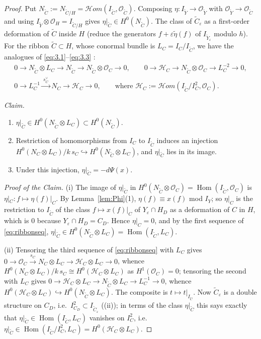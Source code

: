 \documentclass[11pt,twoside]{amsart}
\theoremstyle{plain}
\theoremstyle{definition}
\newcommand{\OO}{\mathcal{O}}
\newcommand{\sHom}{\mathcal{H}om}
\newcommand{\Hom}{\operatorname{Hom}}
\newcommand{\Yt}{\widetilde{Y}}
\newcommand{\Ct}{\widetilde{C}}
\newcommand{\Hc}{\mathcal{H}}
\newcommand{\Dd}{D}
\begin{document}
\begin{proof}
Put $N_{\Ct}:=N_{\Ct/H}=\sHom(I_{\Ct},\OO_{\Ct})$. Composing $\eta\colon I_{\Yt}\to\OO_{\Yt}$ with $\OO_{\Yt}\to\OO_{\Ct}$ and using $I_{\Yt}\otimes\OO_H=I_{\Ct/H}$ gives $\eta|_{\Ct}\in H^0(N_{\Ct})$. The class of $\Ct_\varepsilon$ as a first-order deformation of $\Ct$ inside $H$ (reduce the generators $f+\varepsilon\tilde\eta(f)$ of $I_{\Yt_\varepsilon}$ modulo $h$). For the ribbon $\Ct\subset H$, whose conormal bundle is $L_C=I_C/I_{\Ct}$, we have the analogues of \eqref{eq:3.1}--\eqref{eq:3.3} \cite[Lemma~4.1]{GGP08}:
\begin{equation}\label{eq:ribbonseq}
\begin{gathered}
0\to N_{\Ct}\otimes L_C\to N_{\Ct}\to N_{\Ct}\otimes\OO_C\to0,\qquad
0\to\Hc_C\to N_{\Ct}\otimes\OO_C\to L_C^{-2}\to0,\\
0\to L_C^{-1}\xrightarrow{\ s_C^{\vee}\ }N_C\to\Hc_C\to0,\qquad\text{where }\Hc_C:=\sHom(I_{\Ct}/I_C^2,\OO_C).
\end{gathered}
\end{equation}

\emph{Claim.}
\begin{enumerate}
\item[(i)] $\eta|_{\Ct}\in H^0(N_{\Ct}\otimes L_C)\subset H^0(N_{\Ct})$.
\item[(ii)] Restriction of homomorphisms from $I_C$ to $I_{\Ct}$ induces an injection $H^0(N_C\otimes L_C)/k\,s_C\hookrightarrow H^0(N_{\Ct}\otimes L_C)$, and $\eta|_{\Ct}$ lies in its image.
\item[(iii)] Under this injection, $\eta|_{\Ct}=-d\Psi(x)$.
\end{enumerate}

\emph{Proof of the Claim.} (i) The image of $\eta|_{\Ct}$ in $H^0(N_{\Ct}\otimes\OO_C)=\Hom(I_{\Ct},\OO_C)$ is $\eta|_C\colon f\mapsto\eta(f)|_C$. By Lemma~\ref{lem:Phi}(1), $\eta(f)\equiv x(f)$ mod $I_Y$; so $\eta|_C$ is the restriction to $I_{\Ct}$ of the class $f\mapsto x(f)|_C$ of $Y_\varepsilon\cap H_\Dd$ as a deformation of $C$ in $H$, which is $0$ because $Y_\varepsilon\cap H_\Dd=C_\Dd$. Hence $\eta|_C=0$, and by the first sequence of \eqref{eq:ribbonseq}, $\eta|_{\Ct}\in H^0(N_{\Ct}\otimes L_C)=\Hom(I_{\Ct},L_C)$.

(ii) Tensoring the third sequence of \eqref{eq:ribbonseq} with $L_C$ gives $0\to\OO_C\xrightarrow{s_C}N_C\otimes L_C\to\Hc_C\otimes L_C\to0$, whence $H^0(N_C\otimes L_C)/k\,s_C\cong H^0(\Hc_C\otimes L_C)$ as $H^1(\OO_C)=0$; tensoring the second with $L_C$ gives $0\to\Hc_C\otimes L_C\to N_{\Ct}\otimes L_C\to L_C^{-1}\to0$, whence $H^0(\Hc_C\otimes L_C)\hookrightarrow H^0(N_{\Ct}\otimes L_C)$. The composite is $t\mapsto t|_{I_{\Ct}}$. Now $\Ct_\varepsilon$ is a double structure on $C_\Dd$, i.e.\ $I_{C_\Dd}^2\subset I_{\Ct_\varepsilon}$ ((ii)); in terms of the class $\eta|_{\Ct}$ this says exactly that $\eta|_{\Ct}\in\Hom(I_{\Ct},L_C)$ vanishes on $I_C^2$, i.e.\ $\eta|_{\Ct}\in\Hom(I_{\Ct}/I_C^2,L_C)=H^0(\Hc_C\otimes L_C)$.


\end{proof}
\end{document}
